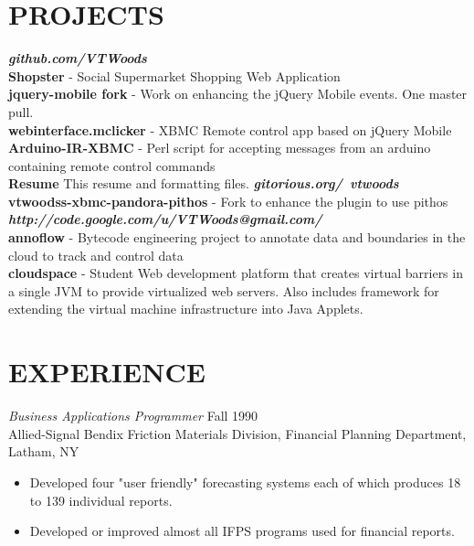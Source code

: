 \documentclass[line,margin]{res}
\begin{document}
\begin{resume}
\section{PROJECTS}
\textbf{\emph{github.com/VTWoods}} \\
\textbf{Shopster} - Social Supermarket Shopping Web Application \\
\textbf{jquery-mobile fork} - Work on enhancing the jQuery Mobile events. One master pull. \\
\textbf{webinterface.mclicker} - XBMC Remote control app based on jQuery Mobile \\
\textbf{Arduino-IR-XBMC} - Perl script for accepting messages from an arduino containing remote control commands \\
\textbf{Resume} This resume and formatting files.
\textbf{\emph{gitorious.org/~vtwoods}} \\
\textbf{vtwoodss-xbmc-pandora-pithos} - Fork to enhance the plugin to use pithos \\
\textbf{\emph{http://code.google.com/u/VTWoods@gmail.com/}} \\
\textbf{annoflow} - Bytecode engineering project to annotate data and boundaries in the cloud to track and control data \\
\textbf{cloudspace} - Student Web development platform that creates virtual barriers in a single JVM to provide virtualized web servers.  Also includes framework for extending the virtual machine infrastructure into Java Applets. \\


\section{EXPERIENCE} {\sl Business Applications Programmer} \hfill Fall 1990 \\
                Allied-Signal Bendix Friction Materials Division, 
                Financial Planning Department, Latham, NY
                 \begin{itemize}  \itemsep -2pt %
                 \item Developed four "user friendly" forecasting 
                    systems each of which produces 18 to 139 
                    individual reports. 
                \item   Developed or improved almost all IFPS 
                    programs used for financial reports. 
                \end{itemize}
 

\end{resume}
\end{document}
